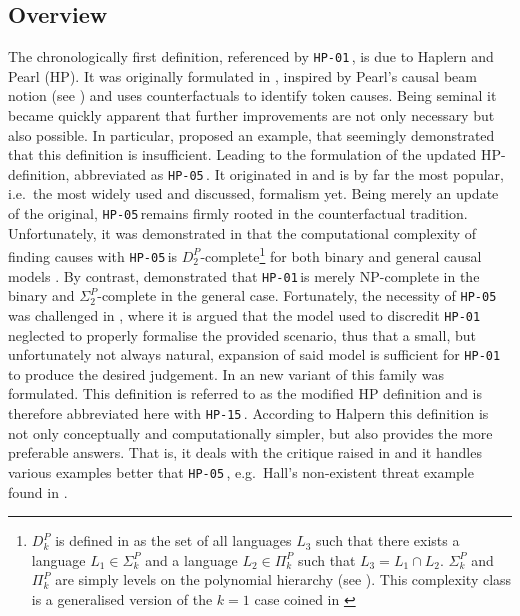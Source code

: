 \documentclass[11pt,a4paper]{book}
\theoremstyle{definition}
\theoremstyle{definition}
\theoremstyle{definition}
\theoremstyle{remark}
\newcommand{\hpo}{\texttt{HP-01}\,}
\newcommand{\hpu}{\texttt{HP-05}\,}
\newcommand{\hpm}{\texttt{HP-15}\,}
\begin{document}
\subsection{Overview}
The chronologically first definition, referenced by \hpo, is due to Haplern and Pearl (HP). It was originally formulated in \parencite{halpern2001causes}, inspired by Pearl's causal beam notion (see \parencite{pearl1998definition}) and uses counterfactuals to identify token causes.
Being seminal it became quickly apparent that further improvements are not only necessary but also possible. In particular, \parencite{hopkins2003clarifying} proposed an example, that seemingly demonstrated that this definition is insufficient. Leading to the formulation of the updated HP-definition, abbreviated as \hpu. It originated in \parencite{halpern2005causes} and is by far the most popular, i.e.\ the most widely used and discussed, formalism yet. Being merely an update of the original, \hpu remains firmly rooted in the counterfactual tradition. 
Unfortunately, it was demonstrated in that the computational complexity of finding causes with \hpu is $D_2^P
$-complete\footnote{$D_k^P$ is defined in \parencite{aleksandrowicz2017computational} as the set of all languages $L_3$ such that there exists a language $L_1 \in \Sigma_k^P$ and a language $L_2 \in \Pi_k^P$ such that $L_3= L_1 \cap L_2$. $\Sigma_k^P$ and $\Pi_k^P$ are simply levels on the polynomial hierarchy (see \parencite[p.~97-99]{arora2009computational}). This complexity class is a generalised version of the $k=1$ case coined in \parencite{papadimitriou1982complexity}} for both binary and general causal models \parencite{aleksandrowicz2017computational}. By contrast, \parencite{eiter2002complexity} demonstrated that \hpo is merely NP-complete in the binary and $\Sigma_2^P$-complete in the general case. Fortunately, the necessity of \hpu was challenged in \parencite{halpern2016appropriate}, where it is argued that the model used to discredit \hpo neglected to properly formalise the provided scenario, thus that a small, but unfortunately not always natural, expansion of said model is sufficient for \hpo to produce the desired judgement. 
In \parencite{halpern2015modification} an new variant of this family was formulated. This definition is referred to as the modified HP definition and is therefore abbreviated here with \hpm.
According to Halpern this definition is not only conceptually and computationally simpler, but also provides the more preferable answers. That is, it deals with the critique raised in \parencite{hopkins2003clarifying} and it handles various examples better that \hpu, e.g.\ Hall's non-existent threat example found in\parencite{hall2007structural} \parencite[p.~27]{halpern2015modification,halpern2016actual}. 
\end{document}
